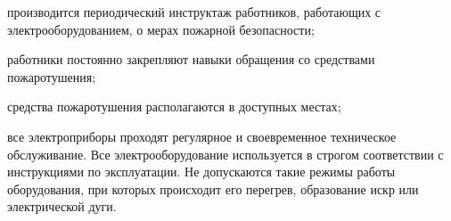 \begin{itemize*}
\item производится периодический инструктаж работников, работающих с электрооборудованием, о мерах пожарной безопасности;
\item работники постоянно закрепляют навыки обращения со средствами пожаротушения;
\item средства пожаротушения располагаются в доступных местах;
\item все электроприборы проходят регулярное и своевременное техническое обслуживание. Все электрооборудование используется в строгом соответствии с инструкциями по эксплуатации. Не допускаются такие режимы работы оборудования, при которых происходит его перегрев, образование искр или электрической дуги.
\end{itemize*}
